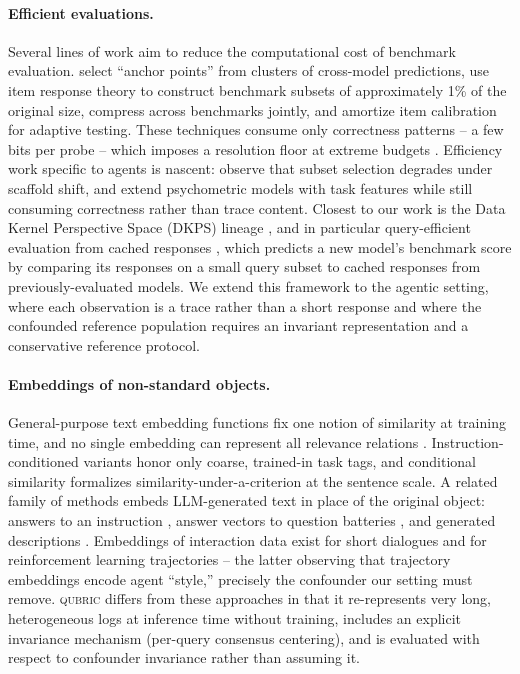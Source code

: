 \documentclass{article}
\newcommand{\qubric}{\textsc{qubric}}
\begin{document}
\paragraph{Efficient evaluations.}
Several lines of work aim to reduce the computational cost of benchmark evaluation.
\citet{vivek2024anchor} select ``anchor points'' from clusters of cross-model predictions, \citet{maiapolo2024tinybenchmarks} use item response theory to construct benchmark subsets of approximately 1\% of the original size, \citet{kipnis2025metabench} compress across benchmarks jointly, and \citet{truong2025amortized} amortize item calibration for adaptive testing.
These techniques consume only correctness patterns -- a few bits per probe -- which imposes a resolution floor at extreme budgets \citep{yauney2026reliable}.
Efficiency work specific to agents is nascent: \citet{ndzomga2026efficient} observe that subset selection degrades under scaffold shift, and \citet{ge2026psychometrics} extend psychometric models with task features while still consuming correctness rather than trace content.
Closest to our work is the Data Kernel Perspective Space (DKPS) lineage \citep{duderstadt2023data, helm2025statistical, acharyya2024consistent}, and in particular query-efficient evaluation from cached responses \citep{helm2026query}, which predicts a new model's benchmark score by comparing its responses on a small query subset to cached responses from previously-evaluated models.
We extend this framework to the agentic setting, where each observation is a trace rather than a short response and where the confounded reference population requires an invariant representation and a conservative reference protocol.

\paragraph{Embeddings of non-standard objects.}
General-purpose text embedding functions \citep{reimers2019sbert} fix one notion of similarity at training time, and no single embedding can represent all relevance relations \citep{weller2025limit}.
Instruction-conditioned variants \citep{su2023instructor} honor only coarse, trained-in task tags, and conditional similarity \citep{deshpande2023csts} formalizes similarity-under-a-criterion at the sentence scale.
A related family of methods embeds LLM-generated text in place of the original object: answers to an instruction \citep{peng2024inbedder}, answer vectors to question batteries \citep{benara2024qaemb}, and generated descriptions \citep{ravfogel2024description}.
Embeddings of interaction data exist for short dialogues \citep{liu2022dial2vec} and for reinforcement learning trajectories \citep{ge2025trajectory} -- the latter observing that trajectory embeddings encode agent ``style,'' precisely the confounder our setting must remove.
\qubric{} differs from these approaches in that it re-represents very long, heterogeneous logs at inference time without training, includes an explicit invariance mechanism (per-query consensus centering), and is evaluated with respect to confounder invariance rather than assuming it.
\end{document}
